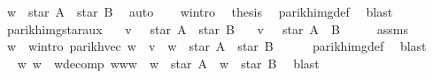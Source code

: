 \begin{isabellebody}
\ {\isachardoublequoteopen}w\ {\isasymin}\ star\ A\ {\isacharat}{\kern0pt}{\isacharat}{\kern0pt}\ star\ B{\isachardoublequoteclose}\ \isamarkupfalse%
\ auto\isanewline
\ \ \isamarkupfalse%
\ w{\isacharunderscore}{\kern0pt}intro\ \isamarkupfalse%
\ {\isacharquery}{\kern0pt}thesis\ \isamarkupfalse%
\ parikh{\isacharunderscore}{\kern0pt}img{\isacharunderscore}{\kern0pt}def\ \isamarkupfalse%
\ blast\isanewline
{}\isamarkupfalse%
%
\endisatagproof
{\isafoldproof}%
%
\isadelimproof
\isanewline
%
\endisadelimproof
\isanewline
{}\isamarkupfalse%
\ parikh{\isacharunderscore}{\kern0pt}img{\isacharunderscore}{\kern0pt}star{\isacharunderscore}{\kern0pt}aux{}{\isacharcolon}{\kern0pt}\isanewline
\ \ \ {\isachardoublequoteopen}v\ {\isasymin}\ {\isasymPsi}\ {\isacharparenleft}{\kern0pt}star\ A\ {\isacharat}{\kern0pt}{\isacharat}{\kern0pt}\ star\ B{\isacharparenright}{\kern0pt}{\isachardoublequoteclose}\isanewline
\ \ \ {\isachardoublequoteopen}v\ {\isasymin}\ {\isasymPsi}\ {\isacharparenleft}{\kern0pt}star\ {\isacharparenleft}{\kern0pt}A\ {\isasymunion}\ B{\isacharparenright}{\kern0pt}{\isacharparenright}{\kern0pt}{\isachardoublequoteclose}\isanewline
%
\isadelimproof
%
\endisadelimproof
%
\isatagproof
{}\isamarkupfalse%
\ {\isacharminus}{\kern0pt}\isanewline
\ \ \isamarkupfalse%
\ assms\ \isamarkupfalse%
\ w\ \ w{\isacharunderscore}{\kern0pt}intro{\isacharcolon}{\kern0pt}\ {\isachardoublequoteopen}parikh{\isacharunderscore}{\kern0pt}vec\ w\ {\isacharequal}{\kern0pt}\ v\ {\isasymand}\ w\ {\isasymin}\ star\ A\ {\isacharat}{\kern0pt}{\isacharat}{\kern0pt}\ star\ B{\isachardoublequoteclose}\isanewline
\ \ \ \ \isamarkupfalse%
\ parikh{\isacharunderscore}{\kern0pt}img{\isacharunderscore}{\kern0pt}def\ \isamarkupfalse%
\ blast\isanewline
\ \ \isamarkupfalse%
\ \isamarkupfalse%
\ w{}\ w{}\ \ w{\isacharunderscore}{\kern0pt}decomp{\isacharcolon}{\kern0pt}\ {\isachardoublequoteopen}w{\isacharequal}{\kern0pt}w{}{\isacharat}{\kern0pt}w{}\ {\isasymand}\ w{}\ {\isasymin}\ star\ A\ {\isasymand}\ w{}\ {\isasymin}\ star\ B{\isachardoublequoteclose}\ \isamarkupfalse%
\ blast\isanewline
\ \ \isamarkupfalse%

\end{isabellebody}
